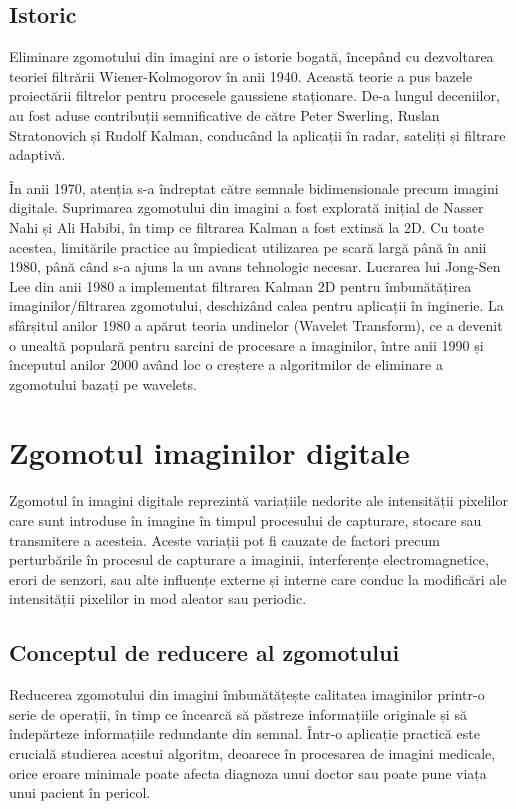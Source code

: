 \documentclass[12pt]{article}
\begin{document}
\subsection{Istoric}
\indent Eliminare zgomotului din imagini are o istorie bogată, începând cu dezvoltarea teoriei filtrării Wiener-Kolmogorov în anii 1940. Această teorie a pus bazele proiectării filtrelor pentru procesele gaussiene staționare. De-a lungul deceniilor, au fost aduse contribuții semnificative de către Peter Swerling, Ruslan Stratonovich și Rudolf Kalman, conducând la aplicații în radar, sateliți și filtrare adaptivă.

\indent În anii 1970, atenția s-a îndreptat către semnale bidimensionale precum imagini digitale. Suprimarea zgomotului din imagini a fost explorată inițial de Nasser Nahi și Ali Habibi, în timp ce filtrarea Kalman a fost extinsă la 2D. Cu toate acestea, limitările practice au împiedicat utilizarea pe scară largă până în anii 1980, până când s-a ajuns la un avans tehnologic necesar. Lucrarea lui Jong-Sen Lee din anii 1980 a implementat filtrarea Kalman 2D pentru îmbunătățirea imaginilor/filtrarea zgomotului, deschizând calea pentru aplicații în inginerie. La sfârșitul anilor 1980 a apărut teoria undinelor (Wavelet Transform), ce a devenit o unealtă populară pentru sarcini de procesare a imaginilor, între anii 1990 și începutul anilor 2000 având loc o creștere a algoritmilor de eliminare a zgomotului bazați pe wavelets.
\newpage



\section{Zgomotul imaginilor digitale}
\label{sec:zgomot_imagini_digitale}
Zgomotul în imagini digitale reprezintă variațiile nedorite ale intensității pixelilor care sunt introduse în imagine în timpul procesului de capturare, stocare sau transmitere a acesteia. Aceste variații pot fi cauzate de factori precum perturbările în procesul de capturare a imaginii, interferențe electromagnetice, erori de senzori, sau alte influențe externe și interne care conduc la modificări ale intensității pixelilor in mod aleator sau periodic. \\


\subsection{Conceptul de reducere al zgomotului}
Reducerea zgomotului din imagini îmbunătățește calitatea imaginilor printr-o serie de operații, în timp ce încearcă să păstreze informațiile originale și să îndepărteze informațiile redundante din semnal. Într-o aplicație practică este crucială studierea acestui algoritm, deoarece în procesarea de imagini medicale, orice eroare minimale poate afecta diagnoza unui doctor sau poate pune viața unui pacient în pericol. \\
\end{document}
